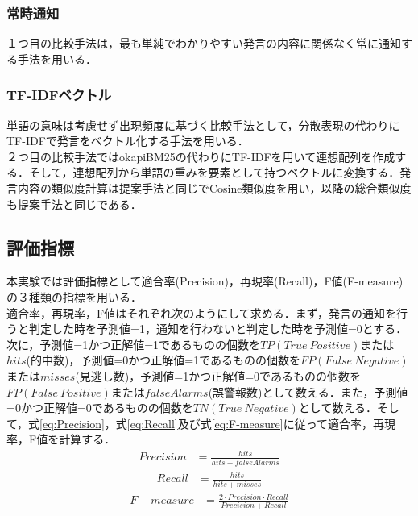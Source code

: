 \subsubsection*{ 常時通知}
１つ目の比較手法は，最も単純でわかりやすい発言の内容に関係なく常に通知する手法を用いる．
\subsubsection*{ TF-IDFベクトル}
単語の意味は考慮せず出現頻度に基づく比較手法として，分散表現の代わりにTF-IDFで発言をベクトル化する手法を用いる．\\
２つ目の比較手法ではokapiBM25の代わりにTF-IDFを用いて連想配列を作成する．そして，連想配列から単語の重みを要素として持つベクトルに変換する．発言内容の類似度計算は提案手法と同じでCosine類似度を用い，以降の総合類似度も提案手法と同じである．

\subsection{評価指標}
本実験では評価指標として適合率(Precision)，再現率(Recall)，F値(F-measure)の３種類の指標を用いる．\\
適合率，再現率，F値はそれぞれ次のようにして求める．まず，発言の通知を行うと判定した時を予測値=1，通知を行わないと判定した時を予測値=0とする．次に，予測値=1かつ正解値=1であるものの個数を$TP(True~Positive)$または$hits$(的中数)，予測値=0かつ正解値=1であるものの個数を$FP(False~Negative)$または$misses$(見逃し数)，予測値=1かつ正解値=0であるものの個数を$FP(False~Positive)$または$falseAlarms$(誤警報数)として数える．また，予測値=0かつ正解値=0であるものの個数を$TN(True~Negative)$として数える．そして，式\ref{eq:Precision}，式\ref{eq:Recall}及び式\ref{eq:F-measure}に従って適合率，再現率，F値を計算する．
\begin{equation}
\begin{aligned}
\label{eq:Precision}
Precision & = \frac{hits}{hits+falseAlarms}
\end{aligned}
\end{equation}
%
\begin{equation}
\begin{aligned}
\label{eq:Recall}
Recall & = \frac{hits}{hits+misses}
\end{aligned}
\end{equation}
%
\begin{equation}
\begin{aligned}
\label{eq:F-measure}
F-measure & = \frac{2 \cdot Precision \cdot Recall}{Precision+Recall}
\end{aligned}
\end{equation}

